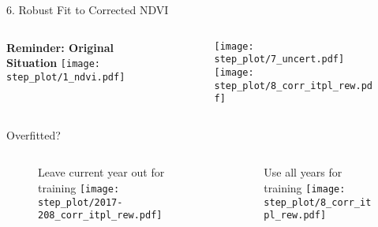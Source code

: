 \begin{frame}[t]{6. Robust Fit to Corrected NDVI}
    \begin{columns}
        \begin{column}{0.45\textwidth}
            \textbf{Reminder: Original Situation}
            \texttt{[image: step\_plot/1\_ndvi.pdf]}
        \end{column}
        \begin{column}{0.45\textwidth}
            \begin{figure}
                \vspace{-1.6cm}
                \texttt{[image: step\_plot/7\_uncert.pdf]}
                \texttt{[image: step\_plot/8\_corr\_itpl\_rew.pdf]}
            \end{figure}
        \end{column}
    \end{columns}
\end{frame}

\begin{frame}[t]{Overfitted?}
    \begin{columns}
        \begin{column}{0.45\textwidth}
            \begin{figure}
                Leave current year out for training
                \texttt{[image: step\_plot/2017-208\_corr\_itpl\_rew.pdf]}
            \end{figure}
        \end{column}
        \begin{column}{0.45\textwidth}
            \begin{figure}
                Use all years for training
                \texttt{[image: step\_plot/8\_corr\_itpl\_rew.pdf]}
            \end{figure}
        \end{column}
    \end{columns}
\end{frame}